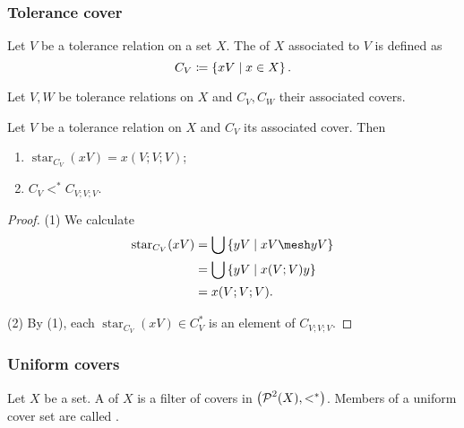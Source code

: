\subsubsection{Tolerance cover}
\begin{definition}
Let $V$ be a tolerance relation on a set $X$. The  of $X$ associated to $V$ is defined as
\[ C_V \coloneqq \left\{ xV \;\middle|\; x\in X \right\}. \]
\end{definition}

\begin{lemma}
Let $V, W$ be tolerance relations on $X$ and $C_V, C_W$ their associated covers.
\end{lemma}

\begin{lemma} \label{toleranceCoverStarRefinement}
Let $V$ be a tolerance relation on $X$ and $C_V$ its associated cover. Then
\begin{enumerate}
\item $\operatorname{star}_{C_V}(xV) = x(V;V;V)$;
\item $C_V <^* C_{V;V;V}$.
\end{enumerate}
\end{lemma}
\begin{proof}
(1) We calculate
\begin{align*}
\operatorname{star}_{C_V}(xV) &= \bigcup \setbuilder{yV}{xV\mesh yV} \\
&= \bigcup \setbuilder{yV}{x(V;V)y} \\
&= x(V;V;V).
\end{align*}

(2) By (1), each $\operatorname{star}_{C_V}(xV)\in C_V^*$ is an element of $C_{V;V;V}$.
\end{proof}

\subsubsection{Uniform covers}
\begin{definition}
Let $X$ be a set. A  of $X$ is a filter of covers in $\left( \operatorname{\mathcal{P}}^2(X), <^* \right)$. Members of a uniform cover set are called .
\end{definition}

